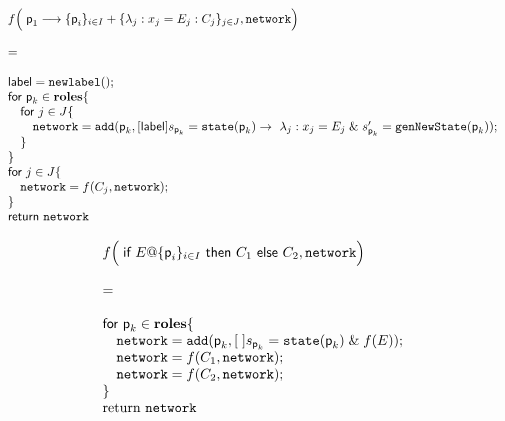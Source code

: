 \begin{displaymath}
  \begin{array}{ll}
    f\Big(\; \textsf{p}_1\longrightarrow\{\textsf{p}_i\}_{i\in I} +\{\lambda_j : x_j=E_j: C_j\}_{j\in J}, \texttt{network}
    \Big)
    \\\\
    =
    \\\\
    \textsf{label} = \texttt{newlabel}();\\
    \textsf{for } \textsf{p}_k \in \mathbf{roles} \{\\
    \quad\textsf{for } j \in J \{\\
    \quad\quad \texttt{network} = \texttt{add}(\textsf{p}_k,[\textsf{label}] {s_{\textsf{p}_k} = \texttt{state}(\textsf{p}_k)} \rightarrow\ \lambda_j : x_j=E_j\;\& \;s_{\textsf{p}_k}'=\texttt{genNewState}(\textsf{p}_k));\\
  	\quad\}\\
  	\}\\
	\textsf{for } j \in J \{\\
	\quad \texttt{network} = f(C_j, \texttt{network});  \\ 
	\}\\
  	\textsf{return } \texttt{network}
  \end{array}
\end{displaymath}

\begin{displaymath}
  \begin{array}{ll}
    f\Big(\; \textsf{if } E@\{\textsf{p}_i\}_{i\in I} \textsf{ then } C_1 \textsf{ else } C_2, \texttt{network} 
    \Big)
    \\\\
    =
    \\\\
    \textsf{for } \textsf{p}_k \in \mathbf{roles} \{\\
    \quad\texttt{network} = \texttt{add}(\textsf{p}_k,[\;] {s_{\textsf{p}_k} = \texttt{state}(\textsf{p}_k)} \;\& \;f(E));\\
	\quad\texttt{network} = f(C_1, \texttt{network}); \\
	\quad\texttt{network} = f(C_2, \texttt{network}); \\
  \}\\
  \text{return } \texttt {network}\\

  \end{array}
\end{displaymath}


